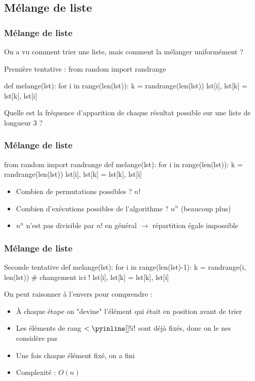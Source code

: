 \documentclass[12pt]{linfo-beamer}
\begin{document}
\subsection{Mélange de liste} %
\label{sub:mélange_de_liste}

\begin{frame}[fragile]
\frametitle{Mélange de liste}

On a vu comment trier une liste, mais comment la mélanger uniformément ?

\begin{pyframe}{Première tentative :}
from random import randrange

def melange(lst):
    for i in range(len(lst)):
        k = randrange(len(lst))
        lst[i], lst[k] = lst[k], lst[i]
\end{pyframe}

 Quelle est la fréquence d'apparition de chaque résultat possible sur une liste de longueur 3 ?

\end{frame}

\begin{frame}[fragile]
\frametitle{Mélange de liste}

\begin{pyframe}{}
from random import randrange
def melange(lst):
    for i in range(len(lst)):
        k = randrange(len(lst))
        lst[i], lst[k] = lst[k], lst[i]
\end{pyframe}

\begin{itemize}
  \item Combien de permutations possibles ? $n!$
  \item Combien d'exécutions possibles de l'algorithme ? $n^n$ (beaucoup plus)
  \item $n^n$ n'est pas divisible par $n!$ en général $\rightarrow$ répartition égale impossible
\end{itemize}

\end{frame}

\begin{frame}[fragile]
\frametitle{Mélange de liste}

\begin{pyframe}{Seconde tentative}
def melange(lst):
    for i in range(len(lst)-1):
        k = randrange(i, len(lst))  # changement ici !
        lst[i], lst[k] = lst[k], lst[i]
\end{pyframe}

On peut raisonner à l'envers pour comprendre :
\begin{itemize}
  \item À chaque étape on "devine" l'élément qui était en position  avant de trier
  \item Les éléments de rang $< \code{i}$ sont déjà fixés, donc on le nes considère pas
  \item Une fois chaque élément fixé, on a fini
  \item Complexité : \pause $O(n)$
\end{itemize}

\end{frame}
\end{document}
